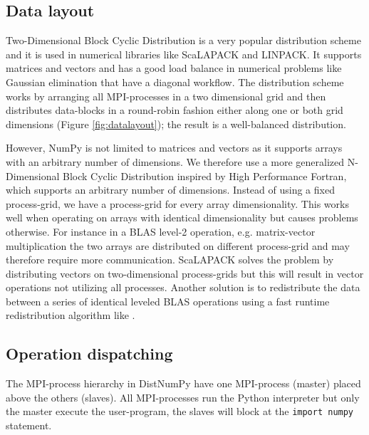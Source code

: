 \documentclass[10pt]{article}
\begin{document}
\subsection{Data layout}
Two-Dimensional Block Cyclic Distribution is a very popular distribution scheme and it is used in numerical libraries like ScaLAPACK\cite{Blackford96} and LINPACK\cite{linpack79}. It supports matrices and vectors and has a good load balance in numerical problems like Gaussian elimination that have a diagonal workflow. The distribution scheme works by arranging all MPI-processes in a two dimensional grid and then distributes data-blocks in a round-robin fashion either along one or both grid dimensions (Figure \ref {fig:datalayout}); the result is a well-balanced distribution.

However, NumPy is not limited to matrices and vectors as it supports arrays with an arbitrary number of dimensions. We therefore use a more generalized N-Dimensional Block Cyclic Distribution inspired by High Performance Fortran\cite{Loveman93}, which supports an arbitrary number of dimensions. Instead of using a fixed process-grid, we have a process-grid for every array dimensionality. This works well when operating on arrays with identical dimensionality but causes problems otherwise. For instance in a BLAS level-2 operation, e.g. matrix-vector multiplication the two arrays are distributed on different process-grid and may therefore require more communication. ScaLAPACK solves the problem by distributing vectors on two-dimensional process-grids but this will result in vector operations not utilizing all processes. Another solution is to redistribute the data between a series of identical leveled BLAS operations using a fast runtime redistribution algorithm like \cite{PrylliT97}.


\subsection{Operation dispatching}
The MPI-process hierarchy in DistNumPy have one MPI-process (master) placed above the others (slaves). All MPI-processes run the Python interpreter but only the master execute the user-program, the slaves will block at the \texttt{import numpy} statement. 
\end{document}
